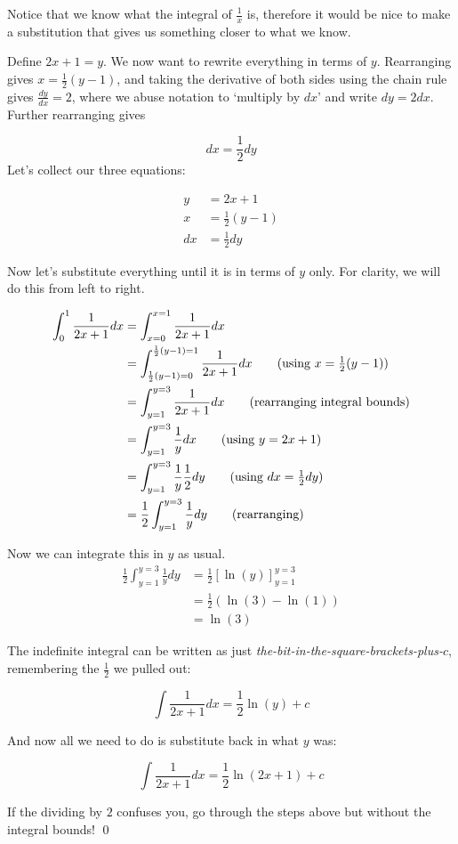 \begin{solution}
    Notice that we know what the integral of $\frac{1}{x}$ is, therefore it would be nice to make a substitution that gives us something closer to what we know.

    Define $2x + 1 = y$. We now want to rewrite everything in terms of $y$. Rearranging gives $x = \frac{1}{2}(y-1)$, and taking the derivative of 
    both sides using the chain rule gives
    $\frac{dy}{dx} = 2$, where we abuse notation to `multiply by $dx$' and write $dy = 2 dx$. Further rearranging gives 

    \[ dx = \frac{1}{2}dy\] 
    Let's collect our three equations:

    \begin{align*}
        y &= 2x + 1 \\
        x &= \frac{1}{2}(y-1) \\
        dx &= \frac{1}{2}dy
    \end{align*}

    Now let's substitute everything until it is in terms of $y$ only. For clarity, we will do this from left to right.

    \begin{align*}
        \int_{0}^{1}\frac{1}{2x + 1} dx  &= \int_{x=0}^{x=1}\frac{1}{2x + 1} dx \\
         &= \int_{\frac{1}{2}(y-1) =0}^{\frac{1}{2}(y-1) =1} \frac{1}{2x + 1}  dx \tag{using $x = \frac{1}{2}(y-1)  $} \\
         &= \int_{y=1}^{y=3} \frac{1}{2x + 1}   dx \tag{rearranging integral bounds} \\
         &= \int_{y=1}^{y=3} \frac{1}{y} dx \tag{using $y = 2x + 1  $} \\
         &= \int_{y=1}^{y=3}\frac{1}{y} \frac{1}{2}dy \tag{using $dx =  \frac{1}{2}dy$} \\
         &= \frac{1}{2} \int_{y=1}^{y=3}\frac{1}{y} dy \tag{rearranging} \\
    \end{align*}

    Now we can integrate this in $y$ as usual.
    \begin{align*}
          \frac{1}{2} \int_{y=1}^{y=3}\frac{1}{y} dy &= \frac{1}{2} \left[ \ln(y) \right]_{y=1}^{y=3} \\
         &=  \frac{1}{2} \left(  \ln(3) - \ln(1)  \right) \\
         &=   \ln(3) 
    \end{align*}

    The indefinite integral can be written as just \emph{the-bit-in-the-square-brackets-plus-$c$}, remembering the $\frac{1}{2}$ we pulled out:

    \[ \int  \frac{1}{2x + 1}dx  = \frac{1}{2}\ln(y) + c \]

    And now all we need to do is substitute back in what $y$ was:

    \[ \int \frac{1}{2x + 1} dx= \frac{1}{2}\ln(2x + 1 ) + c \]

    If the dividing by $2$ confuses you, go through the steps above but without the integral bounds!
    \qed
\end{solution}

